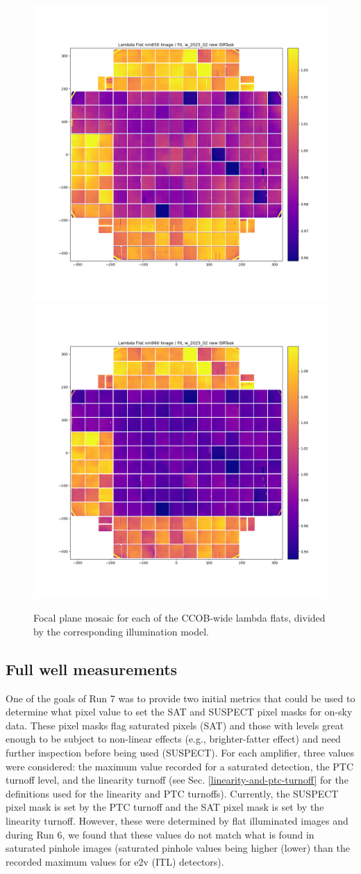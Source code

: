 \begin{figure}[ht]
    \includegraphics[width=0.4\linewidth]{figures/lambda_nm850_E2233.png}
    \includegraphics[width=0.4\linewidth]{figures/lambda_nm960_E2233.png} \\
    \caption{Focal plane mosaic for each of the CCOB-wide lambda flats, divided by the corresponding illumination model.}
    \label{fig:mosaic-relativeqe}
\end{figure}

\clearpage

\clearpage
\subsection{Full well measurements}\label{sec:bfullwellmeasurement}

One of the goals of Run 7 was to provide two initial metrics that could be used to determine what pixel value to set the SAT and SUSPECT pixel masks for on-sky data. These pixel masks flag saturated pixels (SAT) and those with levels great enough to be subject to non-linear effects (e.g., brighter-fatter effect) and need further inspection before being used (SUSPECT). For each amplifier, three values were considered: the maximum value recorded for a saturated detection, the PTC turnoff level, and the linearity turnoff (see Sec. \ref{linearity-and-ptc-turnoff} for the definitions used for the linearity and PTC turnoffs). Currently, the SUSPECT pixel mask is set by the PTC turnoff and the SAT pixel mask is set by the linearity turnoff. However, these were determined by flat illuminated images and during Run 6, we found that these values do not match what is found in saturated pinhole images (saturated pinhole values being higher (lower) than the recorded maximum values for e2v (ITL) detectors).

